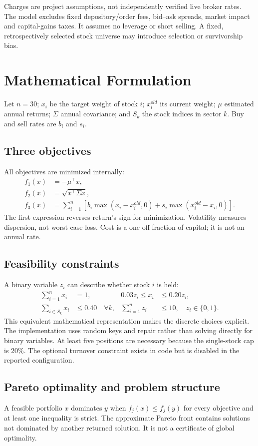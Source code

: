\documentclass[12pt,a4paper]{article}
\newcommand{\newsec}[1]{\section{#1}}
\begin{document}
Charges are project assumptions, not independently verified live broker rates. The model excludes fixed depository/order fees, bid--ask spreads, market impact and capital-gains taxes. It assumes no leverage or short selling. A fixed, retrospectively selected stock universe may introduce selection or survivorship bias.

\newsec{Mathematical Formulation}
Let $n=30$; $x_i$ be the target weight of stock $i$; $x_i^{old}$ its current weight; $\mu$ estimated annual returns; $\Sigma$ annual covariance; and $S_k$ the stock indices in sector $k$. Buy and sell rates are $b_i$ and $s_i$.
\subsection{Three objectives}
All objectives are minimized internally:
\begin{align}
f_1(x)&=-\mu^\top x,\label{eq:return}\\
f_2(x)&=\sqrt{x^\top\Sigma x},\label{eq:risk}\\
f_3(x)&=\sum_{i=1}^{n}\left[b_i\max(x_i-x_i^{old},0)+s_i\max(x_i^{old}-x_i,0)\right].\label{eq:cost}
\end{align}
The first expression reverses return's sign for minimization. Volatility measures dispersion, not worst-case loss. Cost is a one-off fraction of capital; it is not an annual rate.
\subsection{Feasibility constraints}
A binary variable $z_i$ can describe whether stock $i$ is held:
\begin{align}
\sum_{i=1}^{n}x_i&=1, & 0.03z_i\leq x_i&\leq0.20z_i,\\
\sum_{i\in S_k}x_i&\leq0.40\quad \forall k, & \sum_{i=1}^{n}z_i&\leq10,\quad z_i\in\{0,1\}.
\end{align}
This equivalent mathematical representation makes the discrete choices explicit. The implementation uses random keys and repair rather than solving directly for binary variables. At least five positions are necessary because the single-stock cap is 20\%. The optional turnover constraint exists in code but is disabled in the reported configuration.
\subsection{Pareto optimality and problem structure}
A feasible portfolio $x$ dominates $y$ when $f_j(x)\leq f_j(y)$ for every objective and at least one inequality is strict. The approximate Pareto front contains solutions not dominated by another returned solution. It is not a certificate of global optimality.
\end{document}
